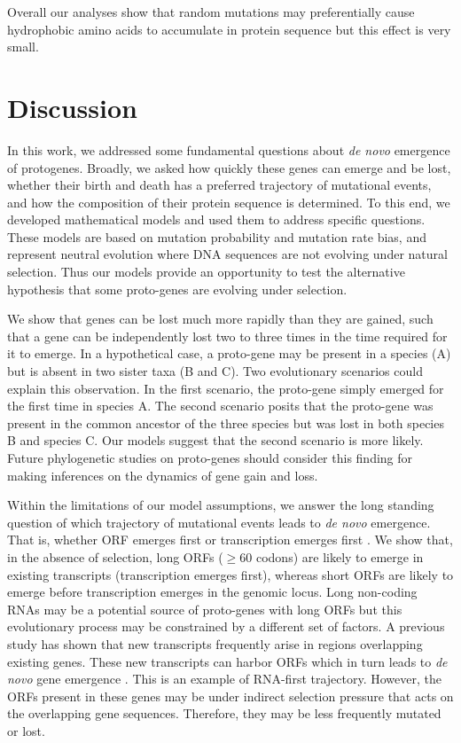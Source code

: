 \documentclass[12pt,a4paper]{article}
\begin{document}
Overall our analyses show that random mutations may preferentially cause hydrophobic amino acids to accumulate in protein sequence but this effect is very small.

\section{Discussion} 

In this work, we addressed some fundamental questions about \textit{de novo} emergence of protogenes. Broadly, we asked how quickly these genes can emerge and be lost, whether their birth and death has a preferred trajectory of mutational events, and how the composition of their protein sequence is determined. To this end, we developed mathematical models and used them to address specific questions. These models are based on mutation probability and mutation rate bias, and represent neutral evolution where DNA sequences are not evolving under natural selection. Thus our models provide an opportunity to test the alternative hypothesis that some proto-genes are evolving under selection.

We show that genes can be lost much more rapidly than they are gained, such that a gene can be independently lost two to three times in the time required for it to emerge. In a hypothetical case, a proto-gene may be present in a species (A) but is absent in two sister taxa (B and C). Two evolutionary scenarios could explain this observation. In the first scenario, the proto-gene simply emerged for the first time in species A. The second scenario posits that the proto-gene was present in the common ancestor of the three species but was lost in both species B and species C. Our models suggest that the second scenario is more likely. Future phylogenetic studies on proto-genes should consider this finding for making inferences on the dynamics of gene gain and loss.

Within the limitations of our model assumptions, we answer the long standing question of which trajectory of mutational events leads to \textit{de novo} emergence. That is, whether ORF emerges first or transcription emerges first \citep{EBB-F1000}. We show that, in the absence of selection, long ORFs ($\geq$60 codons) are likely to emerge in existing transcripts (transcription emerges first), whereas short ORFs are likely to emerge before transcription emerges in the genomic locus. Long non-coding RNAs may be a potential source of proto-genes with long ORFs but this evolutionary process may be constrained by a different set of factors. A previous study has shown that new transcripts frequently arise in regions overlapping existing genes. These new transcripts can harbor ORFs which in turn leads to \textit{de novo} gene emergence \citep{albaYeastdenovo}. This is an example of RNA-first trajectory. However, the ORFs present in these genes may be under indirect selection pressure that acts on the overlapping gene sequences. Therefore, they may be less frequently mutated or lost.
\end{document}
